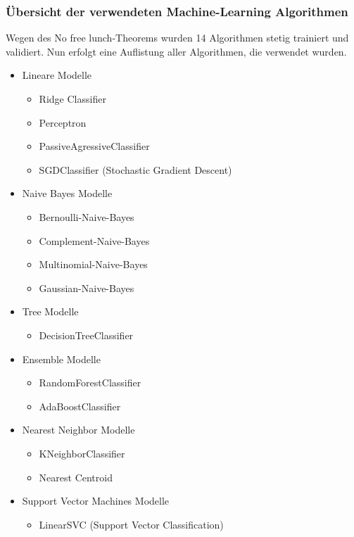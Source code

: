 \subsubsection{Übersicht der verwendeten Machine-Learning Algorithmen}\label{sub:clf}
Wegen des \glqq No free lunch\grqq{}-Theorems wurden 14 Algorithmen stetig trainiert und validiert.
Nun erfolgt eine Auflistung aller Algorithmen, die verwendet wurden.
\begin{itemize}
	\item Lineare Modelle
	\begin{itemize}
		\item Ridge Classifier
		\item Perceptron
		\item PassiveAgressiveClassifier
		\item SGDClassifier (Stochastic Gradient Descent)
	\end{itemize}
	\item Naive Bayes Modelle
	\begin{itemize}
		\item Bernoulli-Naive-Bayes
		\item Complement-Naive-Bayes
		\item Multinomial-Naive-Bayes
		\item Gaussian-Naive-Bayes
	\end{itemize}
	\item Tree Modelle
	\begin{itemize}
		\item DecisionTreeClassifier
	\end{itemize}
	\item Ensemble Modelle
	\begin{itemize}
		\item RandomForestClassifier
		\item AdaBoostClassifier
	\end{itemize}
	\item Nearest Neighbor Modelle
	\begin{itemize}
		\item KNeighborClassifier
		\item Nearest Centroid
	\end{itemize}
	\item Support Vector Machines Modelle
	\begin{itemize}
		\item LinearSVC (Support Vector Classification)
	\end{itemize}
\end{itemize}

